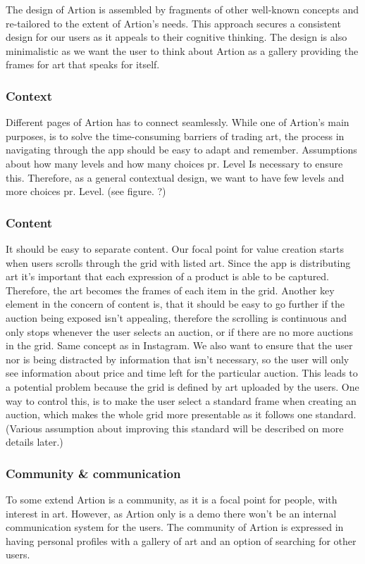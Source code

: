 The design of Artion is assembled by fragments of other well-known concepts and re-tailored to the extent of Artion’s needs. This approach secures a consistent design for our users as it appeals to their cognitive thinking. The design is also minimalistic as we want the user to think about Artion as a gallery providing the frames for art that speaks for itself.
\subsubsection*{Context}
Different pages of Artion has to connect seamlessly. While one of Artion’s main purposes, is to solve the time-consuming barriers of trading art, the process in navigating through the app should be easy to adapt and remember. Assumptions about how many levels and how many choices pr. Level Is necessary to ensure this. Therefore, as a general contextual design, we want to have few levels and more choices pr. Level.  (see figure. ?)
\subsubsection*{Content}
It should be easy to separate content. Our focal point for value creation starts when users scrolls through the grid with listed art. Since the app is distributing art it’s important that each expression of a product is able to be captured. Therefore, the art becomes the frames of each item in the grid. Another key element in the concern of content is, that it should be easy to go further if the auction being exposed isn’t appealing, therefore the scrolling is continuous and only stops whenever the user selects an auction, or if there are no more auctions in the grid. Same concept as in Instagram. We also want to ensure that the user nor is being distracted by information that isn’t necessary, so the user will only see information about price and time left for the particular auction. This leads to a potential problem because the grid is defined by art uploaded by the users. One way to control this, is to make the user select a standard frame when creating an auction, which makes the whole grid more presentable as it follows one standard. (Various assumption about improving this standard will be described on more details later.)
\subsubsection*{Community \& communication}
To some extend Artion is a community, as it is a focal point for people, with interest in art. However, as Artion only is a demo there won’t be an internal communication system for the users. The community of Artion is expressed in having personal profiles with a gallery of art and an option of searching for other users. 
